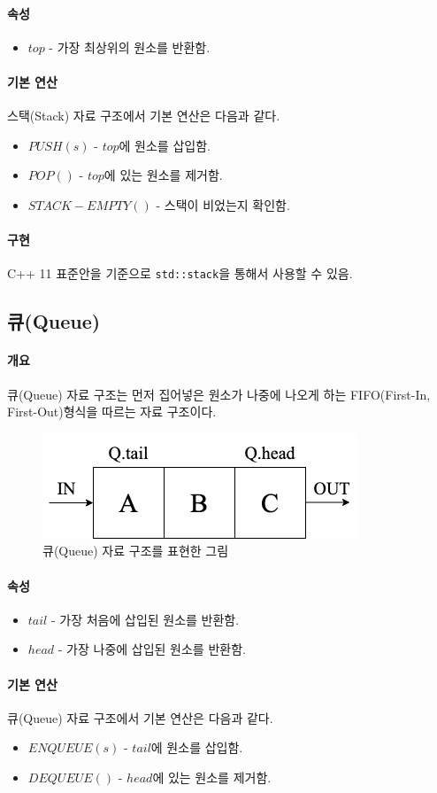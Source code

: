 \documentclass{article}
\begin{document}
    \paragraph{속성}
    \begin{itemize}
        \item $top$ - 가장 최상위의 원소를 반환함.
    \end{itemize}
    \paragraph{기본 연산} 스택(Stack) 자료 구조에서 기본 연산은 다음과 같다.
    \begin{itemize}
        \item $PUSH(s)$ - $top$에 원소를 삽입함.
        \item $POP()$ - $top$에 있는 원소를 제거함.
        \item $STACK-EMPTY()$ - 스택이 비었는지 확인함.
    \end{itemize}
    \paragraph{구현} C++ 11 표준안을 기준으로 \texttt{std::stack}을 통해서 사용할 수 있음.
    \subsection{큐(Queue)}
    \paragraph{개요}
    큐(Queue) 자료 구조는 먼저 집어넣은 원소가 나중에 나오게 하는 FIFO(First-In, First-Out)형식을 따르는 자료 구조이다. \cite{cormen_2009}
    \begin{figure}[h]
        \centering
        \includegraphics[scale=0.5]{Queue.png}
        \caption{큐(Queue) 자료 구조를 표현한 그림}
        \label{}
    \end{figure}
    \paragraph{속성}
    \begin{itemize}
        \item $tail$ - 가장 처음에 삽입된 원소를 반환함.
        \item $head$ - 가장 나중에 삽입된 원소를 반환함.
    \end{itemize}
    \paragraph{기본 연산} 큐(Queue) 자료 구조에서 기본 연산은 다음과 같다.
    \begin{itemize}
        \item $ENQUEUE(s)$ - $tail$에 원소를 삽입함.
        \item $DEQUEUE()$ - $head$에 있는 원소를 제거함.
    \end{itemize}
    
    
\end{document}
